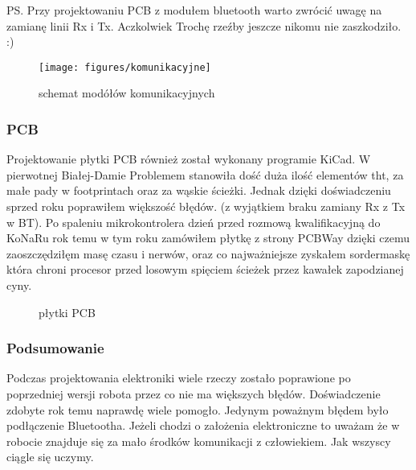 \documentclass[12pt,a4paper]{article}
\begin{document}
PS. Przy projektowaniu PCB z modułem bluetooth warto zwrócić uwagę na zamianę linii Rx i Tx. Aczkolwiek Trochę rzeźby jeszcze nikomu nie zaszkodziło. :)

\begin{figure}[!]
\centering
\texttt{[image: figures/komunikacyjne]}
\caption{schemat modółów komunikacyjnych  \label{fig:komunikacyjnes}}
\end{figure}

\subsubsection{PCB}
Projektowanie płytki PCB również został wykonany programie KiCad. W pierwotnej Białej-Damie Problemem stanowiła dość duża ilość elementów tht, za małe pady w footprintach oraz za wąskie ścieżki. Jednak dzięki doświadczeniu sprzed roku poprawiłem większość błędów. (z wyjątkiem braku zamiany Rx z Tx w BT). Po spaleniu mikrokontrolera dzień przed rozmową kwalifikacyjną do KoNaRu rok temu w tym roku zamówiłem płytkę z strony PCBWay dzięki czemu zaoszczędziłęm masę czasu i nerwów, oraz co najważniejsze zyskałem sordermaskę która chroni procesor przed losowym spięciem ścieżek przez kawałek zapodzianej cyny.

\begin{figure}[tp]
\centering

    \hspace{0.4cm}


    \hspace{0.4cm}

    
    \caption{płytki PCB}
  \end{figure}%




\subsubsection{Podsumowanie}
Podczas projektowania elektroniki wiele rzeczy zostało poprawione po poprzedniej wersji robota przez co nie ma większych błędów. Doświadczenie zdobyte rok temu naprawdę wiele pomogło. Jedynym poważnym błędem było podłączenie Bluetootha. Jeżeli chodzi o założenia elektroniczne to uważam że w robocie znajduje się za mało środków komunikacji z człowiekiem. Jak wszyscy ciągle się uczymy.
\end{document}
